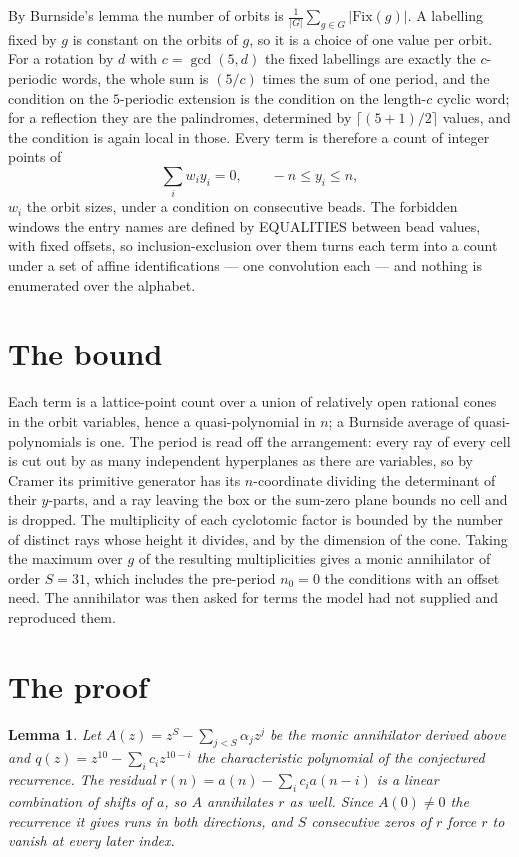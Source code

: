 \documentclass[11pt,a4paper]{article}
\theoremstyle{plain}
\newtheorem{lemma}[theorem]{Lemma}
\theoremstyle{definition}
\begin{document}
By Burnside's lemma the number of orbits is $\frac{1}{|G|}\sum_{g\in G}|\mathrm{Fix}(g)|$.
A labelling fixed by $g$ is constant on the orbits of $g$, so it is a choice of one value per
orbit. For a rotation by $d$ with $c=\gcd(5,d)$ the fixed labellings are exactly the
$c$-periodic words, the whole sum is $(5/c)$ times the sum of one period, and the condition on
the $5$-periodic extension is the condition on the length-$c$ cyclic word; for a reflection
they are the palindromes, determined by $\lceil(5+1)/2\rceil$ values, and the condition is
again local in those. Every term is therefore a count of integer points of
\[
\sum_i w_i y_i = 0, \qquad -n \le y_i \le n,
\]
$w_i$ the orbit sizes, under a condition on consecutive beads. The forbidden windows the entry
names are defined by EQUALITIES between bead values, with fixed offsets, so inclusion-exclusion
over them turns each term into a count under a set of affine identifications --- one
convolution each --- and nothing is enumerated over the alphabet.

\section{The bound}

Each term is a lattice-point count over a union of relatively open rational cones in the orbit
variables, hence a quasi-polynomial in $n$; a Burnside average of quasi-polynomials is one. The
period is read off the arrangement: every ray of every cell is cut out by as many independent
hyperplanes as there are variables, so by Cramer its primitive generator has its $n$-coordinate
dividing the determinant of their $y$-parts, and a ray leaving the box or the sum-zero plane
bounds no cell and is dropped. The multiplicity of each cyclotomic factor is bounded by the
number of distinct rays whose height it divides, and by the dimension of the cone. Taking the
maximum over $g$ of the resulting multiplicities gives a monic annihilator of order
$S=31$, which includes the pre-period $n_0=0$ the conditions with an offset need. The
annihilator was then asked for terms the model had not supplied and reproduced them.

\section{The proof}

\begin{lemma}\label{lem:crit}
Let $A(z)=z^S-\sum_{j<S}\alpha_jz^{j}$ be the monic annihilator derived above and
$q(z)=z^{10}-\sum_ic_iz^{10-i}$ the characteristic polynomial of the conjectured
recurrence. The residual $r(n)=a(n)-\sum_ic_ia(n-i)$ is a linear combination of shifts of $a$,
so $A$ annihilates $r$ as well. Since $A(0)\ne0$ the recurrence it gives runs in both
directions, and $S$ consecutive zeros of $r$ force $r$ to vanish at every later index.
\end{lemma}
\end{document}
